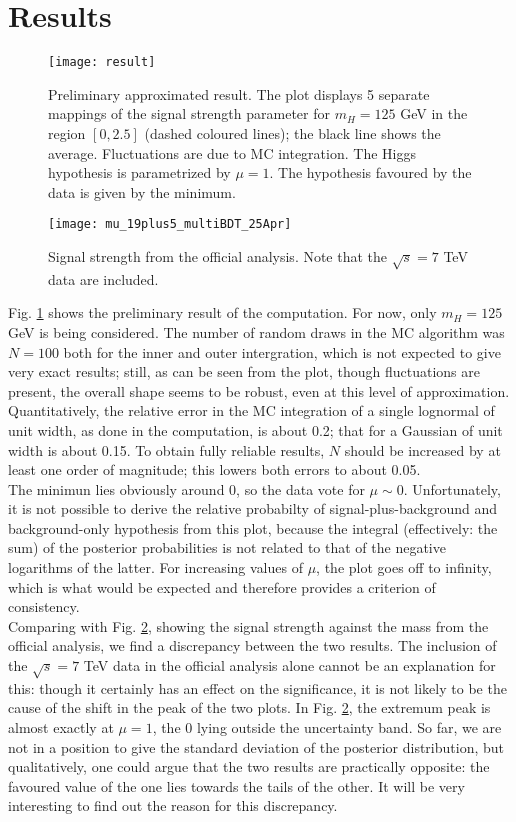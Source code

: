 \documentclass[aps,prb,twocolumn,showpacs,superscriptaddress,groupedaddress]{revtex4}  %
\begin{document}
\section{Results}
\begin{figure}[ht]
\texttt{[image: result]}
\caption{\label{fig:result} Preliminary approximated result. The plot displays 5 separate mappings of the signal strength parameter for $m_{H}=125$ GeV in the region $[0,2.5]$ (dashed coloured lines); the black line shows the average. Fluctuations are due to MC integration. The Higgs hypothesis is parametrized by $\mu=1$. The hypothesis favoured by the data is given by the minimum. }
\end{figure}

\begin{figure}[ht]
\texttt{[image: mu\_19plus5\_multiBDT\_25Apr]}
\caption{\label{fig:official-result} Signal strength from the official analysis. Note that the $\sqrt{s}=7$ TeV data are included.}
\end{figure}
Fig. \ref{fig:result} shows the preliminary result of the computation. For now, only $m_{H}=125$ GeV is being considered. The number of random draws in the MC algorithm was $N=100$ both for the inner and outer intergration, which is not expected to give very exact results; still, as can be seen from the plot, though fluctuations are present, the overall shape seems to be robust, even at this level of approximation. Quantitatively, the relative error in the MC integration of a single lognormal of unit width, as done in the computation, is about 0.2; that for a Gaussian of unit width is about 0.15. To obtain fully reliable results, $N$ should be increased by at least one order of magnitude; this lowers both errors to about 0.05.\\
The minimun lies obviously around 0, so the data vote for $\mu\sim0$. Unfortunately, it is not possible to derive the relative probabilty of signal-plus-background and background-only hypothesis from this plot, because the integral (effectively: the sum) of the posterior probabilities is not related to that of the negative logarithms of the latter. For increasing values of $\mu$, the plot goes off to infinity, which is what would be expected and therefore provides a criterion of consistency.\\
Comparing with Fig. \ref{fig:official-result}, showing the signal strength against the mass from the official analysis\cite{annote}, we find a discrepancy between the two results. The inclusion of the $\sqrt{s}=7$ TeV data in the official analysis alone cannot be an explanation for this: though it certainly has an effect on the significance, it is not likely to be the cause of the shift in the peak of the two plots. In Fig. \ref{fig:official-result}, the extremum peak is almost exactly at $\mu=1$, the 0 lying outside the uncertainty band. So far, we are not in a position to give the standard deviation of the posterior distribution, but qualitatively, one could argue that the two results are practically opposite: the favoured value of the one lies towards the tails of the other. It will be very interesting to find out the reason for this discrepancy.\\
\end{document}
